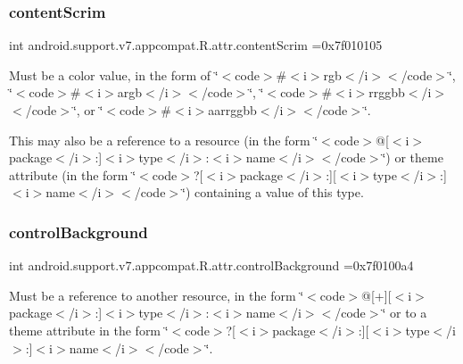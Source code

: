 \subsubsection{\texorpdfstring{content\+Scrim}{contentScrim}}
{\footnotesize\ttfamily int android.\+support.\+v7.\+appcompat.\+R.\+attr.\+content\+Scrim =0x7f010105\hspace{0.3cm}{\ttfamily [static]}}

Must be a color value, in the form of \char`\"{}$<$code$>$\#$<$i$>$rgb$<$/i$>$$<$/code$>$\char`\"{}, \char`\"{}$<$code$>$\#$<$i$>$argb$<$/i$>$$<$/code$>$\char`\"{}, \char`\"{}$<$code$>$\#$<$i$>$rrggbb$<$/i$>$$<$/code$>$\char`\"{}, or \char`\"{}$<$code$>$\#$<$i$>$aarrggbb$<$/i$>$$<$/code$>$\char`\"{}. 

This may also be a reference to a resource (in the form \char`\"{}$<$code$>$@\mbox{[}$<$i$>$package$<$/i$>$\+:\mbox{]}$<$i$>$type$<$/i$>$\+:$<$i$>$name$<$/i$>$$<$/code$>$\char`\"{}) or theme attribute (in the form \char`\"{}$<$code$>$?\mbox{[}$<$i$>$package$<$/i$>$\+:\mbox{]}\mbox{[}$<$i$>$type$<$/i$>$\+:\mbox{]}$<$i$>$name$<$/i$>$$<$/code$>$\char`\"{}) containing a value of this type. \mbox{\label{classandroid_1_1support_1_1v7_1_1appcompat_1_1R_1_1attr_a901159731928d4261753b4ae386d60e3}} 
\subsubsection{\texorpdfstring{control\+Background}{controlBackground}}
{\footnotesize\ttfamily int android.\+support.\+v7.\+appcompat.\+R.\+attr.\+control\+Background =0x7f0100a4\hspace{0.3cm}{\ttfamily [static]}}

Must be a reference to another resource, in the form \char`\"{}$<$code$>$@\mbox{[}+\mbox{]}\mbox{[}$<$i$>$package$<$/i$>$\+:\mbox{]}$<$i$>$type$<$/i$>$\+:$<$i$>$name$<$/i$>$$<$/code$>$\char`\"{} or to a theme attribute in the form \char`\"{}$<$code$>$?\mbox{[}$<$i$>$package$<$/i$>$\+:\mbox{]}\mbox{[}$<$i$>$type$<$/i$>$\+:\mbox{]}$<$i$>$name$<$/i$>$$<$/code$>$\char`\"{}. \mbox{\label{classandroid_1_1support_1_1v7_1_1appcompat_1_1R_1_1attr_a511b4c603ffb630488d846e3e750d2eb}} 

